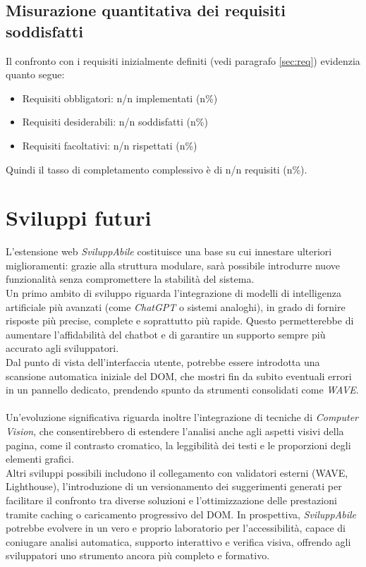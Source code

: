 \subsection{Misurazione quantitativa dei requisiti soddisfatti}
Il confronto con i requisiti inizialmente definiti (vedi paragrafo \ref{sec:req}) evidenzia quanto segue:
\begin{itemize}
    \item Requisiti obbligatori: n/n implementati (n\%)
    \item Requisiti desiderabili: n/n soddisfatti (n\%)
    \item Requisiti facoltativi: n/n rispettati (n\%)
\end{itemize}
Quindi il tasso di completamento complessivo è di n/n requisiti (n\%).

\section{Sviluppi futuri}
\noindent L’estensione web \textit{SviluppAbile} costituisce una base su cui innestare ulteriori miglioramenti: grazie alla struttura modulare, sarà possibile introdurre nuove funzionalità senza compromettere la stabilità del sistema.\\
Un primo ambito di sviluppo riguarda l’integrazione di modelli di intelligenza artificiale più avanzati (come \textit{ChatGPT} o sistemi analoghi), in grado di fornire risposte più precise, complete e soprattutto più rapide. Questo permetterebbe di aumentare l’affidabilità del chatbot e di garantire un supporto sempre più accurato agli sviluppatori.\\
Dal punto di vista dell’interfaccia utente, potrebbe essere introdotta una scansione automatica iniziale del DOM, che mostri fin da subito eventuali errori in un pannello dedicato, prendendo spunto da strumenti consolidati come \textit{WAVE}.\\
\\
Un’evoluzione significativa riguarda inoltre l’integrazione di tecniche di \textit{Computer Vision}, che consentirebbero di estendere l’analisi anche agli aspetti visivi della pagina, come il contrasto cromatico, la leggibilità dei testi e le proporzioni degli elementi grafici.\\
Altri sviluppi possibili includono il collegamento con validatori esterni (WAVE, Lighthouse), l’introduzione di un versionamento dei suggerimenti generati per facilitare il confronto tra diverse soluzioni e l’ottimizzazione delle prestazioni tramite caching o caricamento progressivo del DOM.
In prospettiva, \textit{SviluppAbile} potrebbe evolvere in un vero e proprio laboratorio per l’accessibilità, capace di coniugare analisi automatica, supporto interattivo e verifica visiva, offrendo agli sviluppatori uno strumento ancora più completo e formativo.

